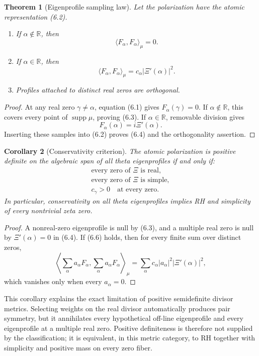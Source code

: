 \documentclass[11pt]{article}
\newtheorem{theorem}{Theorem}[section]
\newtheorem{corollary}[theorem]{Corollary}
\newcommand{\R}{\mathbb R}
\newcommand{\supp}{\operatorname{supp}}
\begin{document}
\begin{theorem}[Eigenprofile sampling law]\label{thm:eigen-sampling}
Let the polarization have the atomic representation (6.2).
\begin{enumerate}[label=\textup{(\roman*)}]
\item If \(\alpha\notin\R\), then
\[
 \langle F_\alpha,F_\alpha\rangle_\mu=0.
\tag{6.3}
\]
\item If \(\alpha\in\R\), then
\[
 \langle F_\alpha,F_\alpha\rangle_\mu
 =c_\alpha|\Xi'(\alpha)|^2.
\tag{6.4}
\]
\item Profiles attached to distinct real zeros are orthogonal.
\end{enumerate}
\end{theorem}

\begin{proof}
At any real zero \(\gamma\ne\alpha\), equation (6.1) gives
\(F_\alpha(\gamma)=0\).  If \(\alpha\notin\R\), this covers every point of
\(\supp\mu\), proving (6.3).  If \(\alpha\in\R\), removable division gives
\[
 F_\alpha(\alpha)=i\Xi'(\alpha).
\tag{6.5}
\]
Inserting these samples into (6.2) proves (6.4) and the orthogonality assertion.
\end{proof}

\begin{corollary}[Conservativity criterion]\label{cor:conservative}
The atomic polarization is positive definite on the algebraic span of all theta eigenprofiles if and only
if:
\[
\begin{gathered}
\text{every zero of \(\Xi\) is real},\\
\text{every zero of \(\Xi\) is simple},\\
c_\gamma>0\quad\text{at every zero}.
\end{gathered}
\tag{6.6}
\]
In particular, conservativity on all theta eigenprofiles implies RH and simplicity of every
nontrivial zeta zero.
\end{corollary}

\begin{proof}
A nonreal-zero eigenprofile is null by (6.3), and a multiple real zero is null by
\(\Xi'(\alpha)=0\) in (6.4).  If (6.6) holds, then for every finite sum over distinct zeros,
\[
 \left\langle\sum_\alpha a_\alpha F_\alpha,
          \sum_\alpha a_\alpha F_\alpha\right\rangle_\mu
 =\sum_\alpha c_\alpha|a_\alpha|^2|\Xi'(\alpha)|^2,
\tag{6.7}
\]
which vanishes only when every \(a_\alpha=0\).
\end{proof}

This corollary explains the exact limitation of positive semidefinite divisor metrics.
Selecting weights on the real divisor automatically produces pair symmetry, but it annihilates
every hypothetical off-line eigenprofile and every eigenprofile at a multiple real zero.
Positive definiteness is therefore not supplied by the classification; it is equivalent, in this
metric category, to RH together with simplicity and positive mass on every zero fiber.
\end{document}
